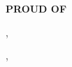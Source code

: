 

\vspace{\spaceBeforeSection}
\textbf{PROUD OF} \hrulefill
\vspace{\spaceAfterSection}


    \href{\achievementAUrl}{\achievementATitleBreak}

    \begin{small}
        \achievementAWho, \ \achievementAWhen
    \end{small}


    \medskip

    \href{\achievementBUrl}{\achievementBTitleBreak}

    \begin{small}
        \achievementBWho, \ \achievementBWhen
    \end{small}

    
